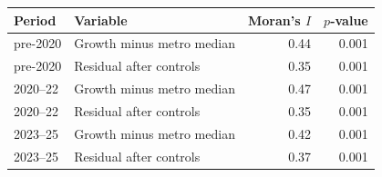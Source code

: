 \footnotesize\setlength{\tabcolsep}{4pt}
\begin{tabular}{llrr}
\toprule
Period & Variable & Moran's $I$ & $p$-value \\
\midrule
pre-2020 & Growth minus metro median & 0.44 & 0.001 \\
pre-2020 & Residual after controls & 0.35 & 0.001 \\
2020--22 & Growth minus metro median & 0.47 & 0.001 \\
2020--22 & Residual after controls & 0.35 & 0.001 \\
2023--25 & Growth minus metro median & 0.42 & 0.001 \\
2023--25 & Residual after controls & 0.37 & 0.001 \\
\bottomrule
\end{tabular}
